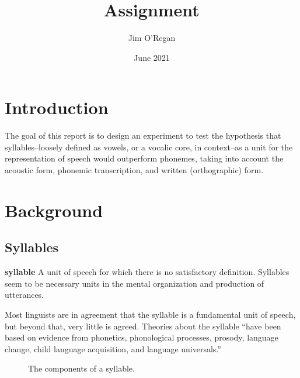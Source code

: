 \documentclass{article}[11pt]
\title{Assignment}
\author{Jim O'Regan}
\date{June 2021}
\begin{document}
\maketitle

\section{Introduction}
\label{sect:intro}

The goal of this report is to design an experiment to test the hypothesis that syllables--loosely defined as vowels, or a vocalic core, in context--as a unit for the representation of speech would outperform phonemes, taking into account the acoustic form, phonemic transcription, and written (orthographic) form.

\section{Background}
\label{sect:bg}

\subsection{Syllables}
\label{ssect:syllables}

\begin{displayquote}
\textbf{syllable} A unit of speech for which there is
no satisfactory definition. Syllables seem to
be necessary units in the mental organization and production of utterances.~\citep{ladefoged_course_2011}
\end{displayquote}

Most linguists are in agreement that the syllable is a fundamental unit of speech, but beyond that, very little is agreed. Theories about the syllable ``have been based on evidence from phonetics, phonological processes, prosody, language change, child language acquisition, and language universals.''~\citep{fallows_experimental_1981}

\begin{figure}[!h]
\caption{The components of a syllable.}
\label{fig:syll}
\centering
{}
\end{figure}
\end{document}
